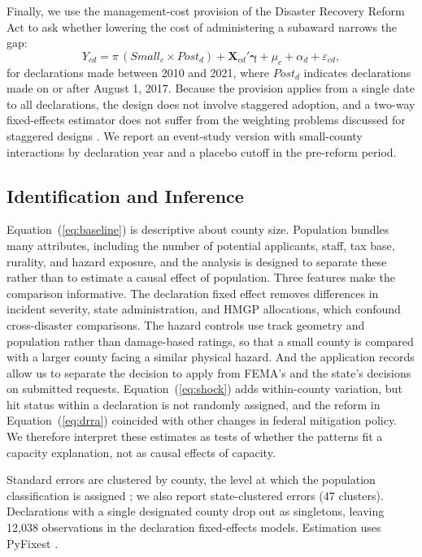 \documentclass[12pt]{article}
\begin{document}
Finally, we use the management-cost provision of the Disaster Recovery Reform Act to ask whether lowering the cost of administering a subaward narrows the gap:
\begin{equation}
Y_{cd} = \pi\, (\mathit{Small}_c \times \mathit{Post}_d) + \mathbf{X}_{cd}'\boldsymbol{\gamma} + \mu_c + \alpha_d + \varepsilon_{cd},
\label{eq:drra}
\end{equation}
for declarations made between 2010 and 2021, where $\mathit{Post}_d$ indicates declarations made on or after August 1, 2017. Because the provision applies from a single date to all declarations, the design does not involve staggered adoption, and a two-way fixed-effects estimator does not suffer from the weighting problems discussed for staggered designs \parencite{roth2023trending}. We report an event-study version with small-county interactions by declaration year and a placebo cutoff in the pre-reform period.

\subsection{Identification and Inference}

Equation~(\ref{eq:baseline}) is descriptive about county size. Population bundles many attributes, including the number of potential applicants, staff, tax base, rurality, and hazard exposure, and the analysis is designed to separate these rather than to estimate a causal effect of population. Three features make the comparison informative. The declaration fixed effect removes differences in incident severity, state administration, and HMGP allocations, which confound cross-disaster comparisons. The hazard controls use track geometry and population rather than damage-based ratings, so that a small county is compared with a larger county facing a similar physical hazard. And the application records allow us to separate the decision to apply from FEMA's and the state's decisions on submitted requests. Equation~(\ref{eq:shock}) adds within-county variation, but hit status within a declaration is not randomly assigned, and the reform in Equation~(\ref{eq:drra}) coincided with other changes in federal mitigation policy. We therefore interpret these estimates as tests of whether the patterns fit a capacity explanation, not as causal effects of capacity.

Standard errors are clustered by county, the level at which the population classification is assigned \parencite{abadie2023cluster,cameron2015practitioner}; we also report state-clustered errors (47 clusters). Declarations with a single designated county drop out as singletons, leaving 12,038 observations in the declaration fixed-effects models. Estimation uses PyFixest \parencite{pyfixest}.
\end{document}
